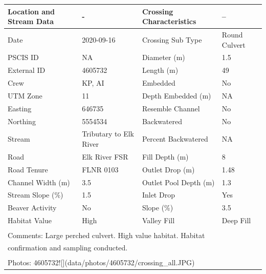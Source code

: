 \documentclass[
]{book}
\begin{document}
\begin{tabular}{llll}
\toprule
Location and Stream Data & - & Crossing Characteristics & --\\
\midrule
Date & 2020-09-16 & Crossing Sub Type & Round Culvert\\
PSCIS ID & NA & Diameter (m) & 1.5\\
External ID & 4605732 & Length (m) & 49\\
Crew & KP, AI & Embedded & No\\
UTM Zone & 11 & Depth Embedded (m) & NA\\
\addlinespace
Easting & 646735 & Resemble Channel & No\\
Northing & 5554534 & Backwatered & No\\
Stream & Tributary to Elk River & Percent Backwatered & NA\\
Road & Elk River FSR & Fill Depth (m) & 8\\
Road Tenure & FLNR 0103 & Outlet Drop (m) & 1.48\\
\addlinespace
Channel Width (m) & 3.5 & Outlet Pool Depth (m) & 1.3\\
Stream Slope (\%) & 1.5 & Inlet Drop & Yes\\
Beaver Activity & No & Slope (\%) & 3.5\\
Habitat Value & High & Valley Fill & Deep Fill\\
\bottomrule
\multicolumn{4}{l}{\textsuperscript{} Comments: Large perched culvert. High value habitat. Habitat}\\
\multicolumn{4}{l}{confirmation and sampling conducted.}\\
\multicolumn{4}{l}{\textsuperscript{} Photos: 4605732![](data/photos/4605732/crossing\_all.JPG)}\\
\end{tabular}
\end{document}
